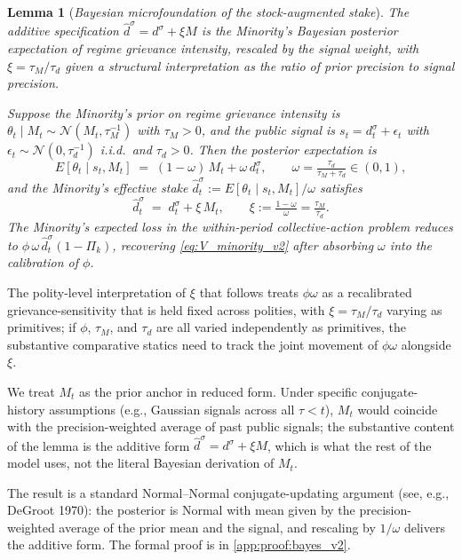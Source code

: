 \documentclass[11pt,twoside]{extarticle}
\newtheorem{lemma}{Lemma}
\begin{document}
\begin{lemma}[\emph{Bayesian microfoundation of the stock-augmented stake}]\label{lem:bayes_v2}
\emph{The additive specification $\hat d^\sigma = d^\sigma + \xi M$ is the Minority's Bayesian posterior expectation of regime grievance intensity, rescaled by the signal weight, with $\xi = \tau_M/\tau_d$ given a structural interpretation as the ratio of prior precision to signal precision.}

Suppose the Minority's prior on regime grievance intensity is $\theta_t\mid M_t\sim\mathcal{N}(M_t,\tau_M^{-1})$ with $\tau_M>0$, and the public signal is $s_t = d_t^\sigma + \epsilon_t$ with $\epsilon_t\sim\mathcal{N}(0,\tau_d^{-1})$ i.i.d.\ and $\tau_d>0$. Then the posterior expectation is
\begin{equation}\label{eq:bayes_post_v2}
    E[\theta_t\mid s_t,M_t]\;=\;(1-\omega)\,M_t+\omega\,d_t^\sigma,\qquad\omega=\tfrac{\tau_d}{\tau_M+\tau_d}\in(0,1),
\end{equation}
and the Minority's effective stake $\hat d_t^\sigma:=E[\theta_t\mid s_t,M_t]/\omega$ satisfies
\begin{equation}\label{eq:bayes_form_v2}
    \hat d_t^\sigma\;=\;d_t^\sigma+\xi\,M_t,\qquad\xi:=\tfrac{1-\omega}{\omega}=\tfrac{\tau_M}{\tau_d}.
\end{equation}
The Minority's expected loss in the within-period collective-action problem reduces to $\phi\,\omega\,\hat d_t^\sigma(1-\Pi_k)$, recovering \autoref{eq:V_minority_v2} after absorbing $\omega$ into the calibration of $\phi$.
\end{lemma}

The polity-level interpretation of $\xi$ that follows treats $\phi\omega$ as a recalibrated grievance-sensitivity that is held fixed across polities, with $\xi=\tau_M/\tau_d$ varying as primitives; if $\phi$, $\tau_M$, and $\tau_d$ are all varied independently as primitives, the substantive comparative statics need to track the joint movement of $\phi\omega$ alongside $\xi$.

We treat $M_t$ as the prior anchor in reduced form. Under specific conjugate-history assumptions (e.g., Gaussian signals across all $\tau<t$), $M_t$ would coincide with the precision-weighted average of past public signals; the substantive content of the lemma is the additive form $\hat d^\sigma=d^\sigma+\xi M$, which is what the rest of the model uses, not the literal Bayesian derivation of $M_t$.

The result is a standard Normal--Normal conjugate-updating argument (see, e.g., DeGroot 1970): the posterior is Normal with mean given by the precision-weighted average of the prior mean and the signal, and rescaling by $1/\omega$ delivers the additive form. The formal proof is in \autoref{app:proof:bayes_v2}.
\end{document}
